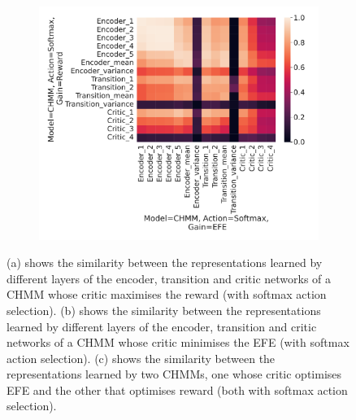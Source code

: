 \documentclass[twoside,11pt]{article}
\begin{document}
\begin{figure}[ht!]
\begin{subfigure}{.3\textwidth}
        \caption{}\label{sfig:cka-chmm2-chmm2-sm}
    \end{subfigure}%
    \begin{subfigure}{.3\textwidth}
        \centering
        \includegraphics[draft=false,width=\linewidth]{cka_figures/CKA_chmm_109_chmm_113}
        \caption{}\label{sfig:cka-chmm-chmm2-sm}
    \end{subfigure}

    \caption{(a) shows the similarity between the representations learned by different layers of the encoder, transition and critic networks of a CHMM whose critic maximises the reward (with softmax action selection). (b) shows the similarity between the representations learned by different layers of the encoder, transition and critic networks of a CHMM whose critic minimises the EFE (with softmax action selection). (c) shows the similarity between the representations learned by two CHMMs, one whose critic optimises EFE and the other that optimises reward (both with softmax action selection).}
    \label{fig:cka-chmm-sm}
\end{figure}
\end{document}
